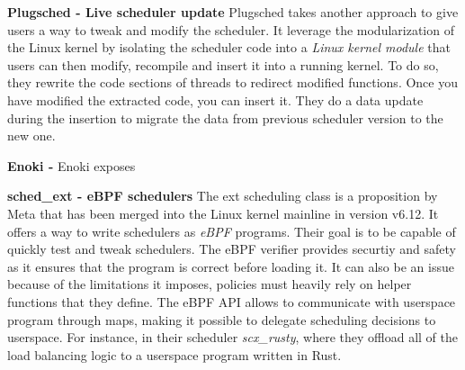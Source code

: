 \par \textbf{Plugsched - Live scheduler update} Plugsched takes another approach to give users a way to tweak and modify the scheduler. It leverage the modularization of the Linux kernel by isolating the scheduler code into a \textit{Linux kernel module} that users can then modify, recompile and insert it into a running kernel. To do so, they rewrite the code sections of threads to redirect modified functions. Once you have modified the extracted code, you can insert it. They do a data update during the insertion to migrate the data from previous scheduler version to the new one.\newline

\par \textbf{Enoki - } Enoki exposes \newline

\par \textbf{sched\_ext - eBPF schedulers} The ext scheduling class is a proposition by Meta that has been merged into the Linux kernel mainline in version v6.12. It offers a way to write schedulers as \textit{eBPF} programs. Their goal is to be capable of quickly test and tweak schedulers. The eBPF verifier provides securtiy and safety as it ensures that the program is correct before loading it. It can also be an issue because of the limitations it imposes, policies must heavily rely on helper functions that they define. The eBPF API allows to communicate with userspace program through maps, making it possible to delegate scheduling decisions to userspace. For instance, in their scheduler \textit{scx\_rusty}, where they offload all of the load balancing logic to a userspace program written in Rust.\newline

